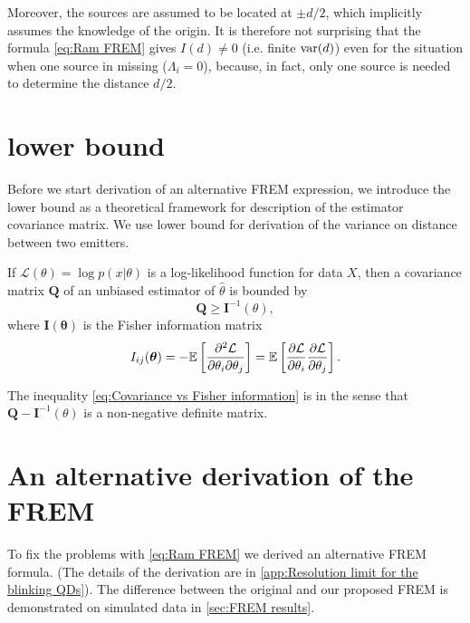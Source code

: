 Moreover, the sources are assumed to be located at $\pm d/2$, which implicitly assumes the knowledge of the origin. It is therefore not surprising that the formula \autoref{eq:Ram FREM} gives $I(d)\neq0$ (i.e. finite $\mathrm{var}(d)$) even for the situation when one source in missing ($\Lambda_i=0$), because, in fact, only one source is needed to determine the distance $d/2$. 


\section{\CR lower bound}

Before we start derivation of an alternative FREM expression, we introduce the \CR lower bound as a theoretical framework for description of the estimator covariance matrix. We use \CR lower bound for derivation of the variance on distance between two emitters.
  
If $\mathcal{L}(\theta)=\log p(x|\theta)$ is a log-likelihood function for data $X$, then a covariance matrix $\bm{Q}$ of an unbiased estimator of $\hat{\theta}$ is bounded by \cite{Rao1945,Cover1991} 
%
\begin{equation}
	\bm{Q}\geq\bm{I}^{-1}(\theta),
	\label{eq:Covariance vs Fisher information}
\end{equation}
%
where $\bm{I}(\bm{\theta})$ is the Fisher information matrix 
%
\begin{equation}
	I_{ij}(\bm{\theta})=-\mathbb{E}\left[\frac{\partial^2\mathcal{L}}{\partial\theta_i\partial\theta_j}\right]=\mathbb{E}\left[\frac{\partial\mathcal{L}}{\partial\theta_i}\frac{\partial\mathcal{L}}{\partial\theta_j}\right].
	\label{eq:Fisher information general}
\end{equation}

The inequality \autoref{eq:Covariance vs Fisher information} is in the sense that $\bm{Q}-\bm{I}^{-1}(\theta)$ is a non-negative definite matrix.



\section{An alternative derivation of the FREM\label{sub:An-alternative-derivation-FREM}} 

To fix the problems with \autoref{eq:Ram FREM} we derived an alternative FREM formula. (The details of the derivation are in \autoref{app:Resolution limit for the blinking QDs}). The difference between the original and our proposed FREM is demonstrated on simulated data in \autoref{sec:FREM results}.

